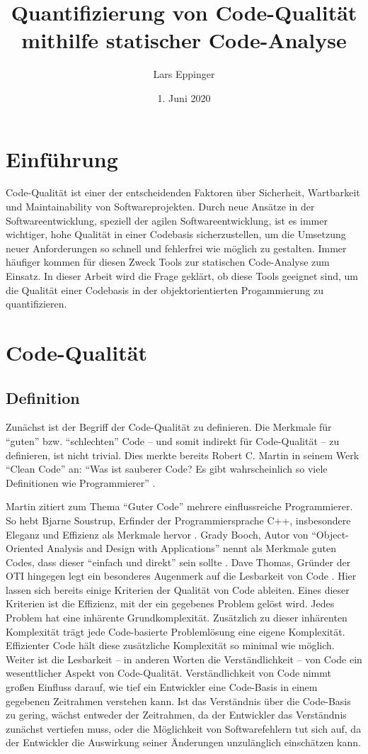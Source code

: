\documentclass[a4paper, 12pt]{article}
\author{Lars Eppinger}
\title{Quantifizierung von Code-Qualität mithilfe statischer Code-Analyse}
\date{1. Juni 2020}
\begin{document}

\tableofcontents
\newpage

\section{Einführung}
Code-Qualität ist einer der entscheidenden Faktoren über Sicherheit, Wartbarkeit und Maintainability von Softwareprojekten. 
Durch neue Ansätze in der Softwareentwicklung, speziell der agilen Softwareentwicklung, ist es immer wichtiger, hohe Qualität in einer Codebasis sicherzustellen, um die Umsetzung neuer Anforderungen so schnell und fehlerfrei wie möglich zu gestalten.
Immer häufiger kommen für diesen Zweck Tools zur statischen Code-Analyse zum Einsatz.
In dieser Arbeit wird die Frage geklärt, ob diese Tools geeignet sind, um die Qualität einer Codebasis in der objektorientierten Progammierung zu quantifizieren.

\section{Code-Qualität}
\subsection{Definition}
Zunächst ist der Begriff der Code-Qualität zu definieren. 
Die Merkmale für \enquote{guten} bzw. \enquote{schlechten} Code -- und somit indirekt für Code-Qualität -- zu definieren, ist nicht trivial.
Dies merkte bereits Robert C. Martin in seinem Werk \enquote{Clean Code} an: \enquote{Was ist sauberer Code? Es gibt wahrscheinlich so viele Definitionen wie Programmierer} \parencites[32]{Martin2009}.

Martin zitiert zum Thema \enquote{Guter Code} mehrere einflussreiche Programmierer.
So hebt Bjarne Soustrup, Erfinder der Programmiersprache C++, insbesondere Eleganz und Effizienz als Merkmale hervor \parencites[32]{Martin2009}. Grady Booch, Autor von \enquote{Object-Oriented Analysis and Design with Applications} nennt als Merkmale guten Codes, dass dieser \enquote{einfach und direkt} sein sollte \parencites[34]{Martin2009}. Dave Thomas, Gründer der OTI hingegen legt ein besonderes Augenmerk  auf die Lesbarkeit von Code \parencites[35]{Martin2009}. 
Hier lassen sich bereits einige Kriterien der Qualität von Code ableiten.
Eines dieser Kriterien ist die Effizienz, mit der ein gegebenes Problem gelöst wird.
Jedes Problem hat eine inhärente Grundkomplexität.
Zusätzlich zu dieser inhärenten Komplexität trägt jede Code-basierte Problemlösung eine eigene Komplexität.
Effizienter Code hält diese zusätzliche Komplexität so minimal wie möglich.
Weiter ist die Lesbarkeit -- in anderen Worten die Verständlichkeit -- von Code ein wesenttlicher Aspekt von Code-Qualität.
Verständlichkeit von Code nimmt großen Einfluss darauf, wie tief ein Entwickler eine Code-Basis in einem gegebenen Zeitrahmen verstehen kann.
Ist das Verständnis über die Code-Basis zu gering, wächst entweder der Zeitrahmen, da der Entwickler das Verständnis zunächst vertiefen muss, oder die Möglichkeit von Softwarefehlern tut sich auf, da der Entwickler die Auswirkung seiner Änderungen unzulänglich einschätzen kann.
\end{document}

